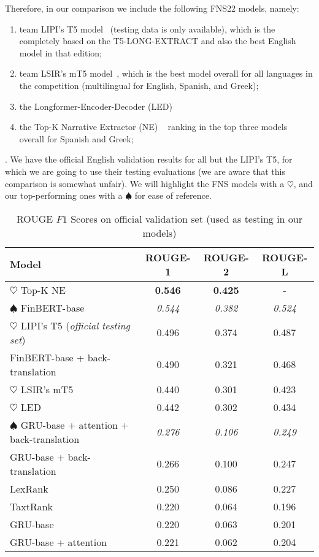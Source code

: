 Therefore, in our comparison we include the following FNS22 models, namely:
\begin{enumerate}
    \item team LIPI's T5 model~\cite{el-haj-etal-2022-financial} (testing data is only available), which is the completely based on the T5-LONG-EXTRACT and also the best English model in that edition;
    \item team LSIR's mT5 model~\cite{foroutan-etal-2022-multilingual}, which is the best model overall for all languages in the competition (multilingual for English, Spanish, and Greek);
    \item the Longformer-Encoder-Decoder (LED)~\cite{khanna-etal-2022-transformer}
    \item the Top-K Narrative Extractor (NE) ~\cite{shukla-etal-2022-dimsum}  ranking in the top three models overall for Spanish and Greek;
\end{enumerate}.
We have the official English validation results for all but the LIPI's T5, for which we are going to use their testing evaluations (we are aware that this comparison is somewhat unfair).
We will highlight the FNS models with a $\heartsuit$, and our top-performing ones with a $\spadesuit$ for ease of reference.

\begin{table}[ht]
    \centering
    \begin{tabular}{lccc}
        \toprule
        \textbf{Model} & \textbf{ROUGE-1} & \textbf{ROUGE-2} & \textbf{ROUGE-L} \\
        \midrule
            $\heartsuit$ Top-K NE & \textbf{0.546} & \textbf{0.425} & - \\
            $\spadesuit$ FinBERT-base & \emph{0.544} & \emph{0.382} & \emph{0.524} \\
            $\heartsuit$ LIPI's T5 (\emph{official testing set}) & 0.496 & 0.374 & 0.487 \\
            FinBERT-base + back-translation & 0.490 & 0.321 & 0.468 \\
            $\heartsuit$ LSIR's mT5 & 0.440 & 0.301 & 0.423 \\
            $\heartsuit$ LED & 0.442 & 0.302 & 0.434 \\
            $\spadesuit$ GRU-base + attention + back-translation & \emph{0.276} & \emph{0.106} & \emph{0.249} \\
            GRU-base + back-translation & 0.266 & 0.100 & 0.247 \\
            LexRank & 0.250 & 0.086 & 0.227 \\
            TaxtRank & 0.220 & 0.064 & 0.196 \\
            GRU-base & 0.220 & 0.063 & 0.201 \\
            GRU-base + attention & 0.221 & 0.062 & 0.204 \\
        \bottomrule
    \end{tabular}\caption{ROUGE $F1$ Scores on official validation set (used as testing in our models)}
    \label{tab:rouge_performance_validation}
\end{table}

